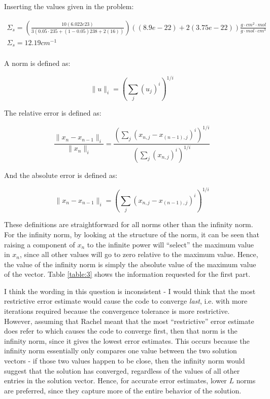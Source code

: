 \documentclass[10pt]{article}
\newcommand*\circled[1]{\tikz[baseline=(char.base)]{
            \node[shape=circle,draw,inner sep=2pt] (char) {#1};}}
\begin{document}
Inserting the values given in the problem:

\begin{equation}
\begin{aligned}
\Sigma_s=\left(\frac{10(6.022e23)}{3\left(0.05\cdot235+(1-0.05)238+2(16)\right)}\right)((8.9e-22)+2(3.75e-22))\frac{g\cdot cm^2\cdot mol}{g\cdot mol\cdot cm^3}\\
\Sigma_s=12.19 cm^{-1}\\
\end{aligned}
\end{equation}

\circled{3}\newline

A norm is defined as:

\begin{equation}
\|u\|_i=\left(\sum_{j}^{}(u_j)^i\right)^{1/i}
\end{equation}

The relative error is defined as:

\begin{equation}
\frac{\|x_n-x_{n-1}\|_i}{\|x_n\|_i}=\frac{\left(\sum_{j}^{}(x_{n,j}-x_{(n-1),j})^i\right)^{1/i}}{\left(\sum_{j}^{}(x_{n,j})^i\right)^{1/i}}
\end{equation}

And the absolute error is defined as:

\begin{equation}
\|x_n-x_{n-1}\|_i=\left(\sum_{j}^{}(x_{n,j}-x_{(n-1),j})^i\right)^{1/i}
\end{equation}

These definitions are straightforward for all norms other than the infinity norm. For the infinity norm, by looking at the structure of the norm, it can be seen that raising a component of \(x_n\) to the infinite power will ``select'' the maximum value in \(x_n\), since all other values will go to zero relative to the maximum value. Hence, the value of the infinity norm is simply the absolute value of the maximum value of the vector. Table \ref{table:3} shows the information requested for the first part. 

I think the wording in this question is inconsistent - I would think that the most restrictive error estimate would cause the code to converge \textit{last}, i.e. with more iterations required because the convergence tolerance is more restrictive. However, assuming that Rachel meant that the most ``restrictive'' error estimate does refer to which causes the code to converge first, then that norm is the infinity norm, since it gives the lowest error estimates. This occurs because the infinity norm essentially only compares one value between the two solution vectors - if those two values happen to be close, then the infinity norm would suggest that the solution has converged, regardless of the values of all other entries in the solution vector. Hence, for accurate error estimates, lower \(L\) norms are preferred, since they capture more of the entire behavior of the solution.
\end{document}
